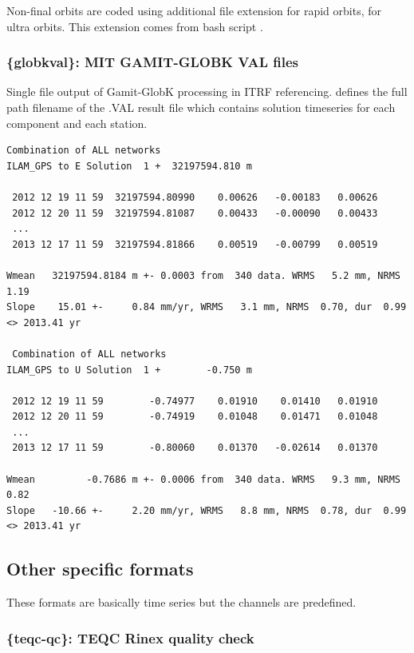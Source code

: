 Non-final orbits are coded using additional file extension  for rapid orbits,  for ultra orbits. This extension comes from bash script .

\subsubsection{\{globkval\}: MIT GAMIT-GLOBK VAL files}

Single file output of Gamit-GlobK processing in ITRF referencing.  defines the full path filename of the .VAL result file which contains solution timeseries for each component and each station.

\begin{lstlisting}[language={},title=GAMIT-GLOBK VAL format example]
 Combination of ALL networks
ILAM_GPS to E Solution  1 +  32197594.810 m

 2012 12 19 11 59  32197594.80990    0.00626   -0.00183   0.00626
 2012 12 20 11 59  32197594.81087    0.00433   -0.00090   0.00433
 ...
 2013 12 17 11 59  32197594.81866    0.00519   -0.00799   0.00519

Wmean   32197594.8184 m +- 0.0003 from  340 data. WRMS   5.2 mm, NRMS  1.19
Slope    15.01 +-     0.84 mm/yr, WRMS   3.1 mm, NRMS  0.70, dur  0.99 <> 2013.41 yr

 Combination of ALL networks
ILAM_GPS to U Solution  1 +        -0.750 m

 2012 12 19 11 59        -0.74977    0.01910    0.01410   0.01910
 2012 12 20 11 59        -0.74919    0.01048    0.01471   0.01048
 ...
 2013 12 17 11 59        -0.80060    0.01370   -0.02614   0.01370

Wmean         -0.7686 m +- 0.0006 from  340 data. WRMS   9.3 mm, NRMS  0.82
Slope   -10.66 +-     2.20 mm/yr, WRMS   8.8 mm, NRMS  0.78, dur  0.99 <> 2013.41 yr
\end{lstlisting}


\subsection{Other specific formats}

These formats are basically time series but the channels are predefined.

\subsubsection{\{teqc-qc\}: TEQC Rinex quality check}

